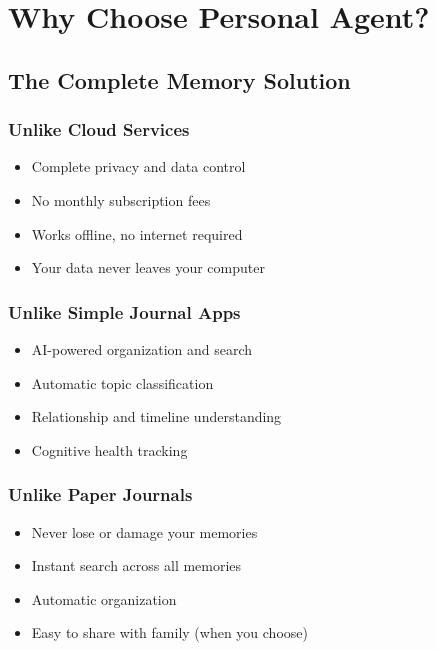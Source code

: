 \documentclass[11pt,letterpaper]{article}
\begin{document}
\section{Why Choose Personal Agent?}

\subsection{The Complete Memory Solution}

\subsubsection{Unlike Cloud Services}
\begin{itemize}[leftmargin=*]
    \item \textcolor{secondarygreen}{\checkmark} Complete privacy and data control
    \item \textcolor{secondarygreen}{\checkmark} No monthly subscription fees
    \item \textcolor{secondarygreen}{\checkmark} Works offline, no internet required
    \item \textcolor{secondarygreen}{\checkmark} Your data never leaves your computer
\end{itemize}

\subsubsection{Unlike Simple Journal Apps}
\begin{itemize}[leftmargin=*]
    \item \textcolor{secondarygreen}{\checkmark} AI-powered organization and search
    \item \textcolor{secondarygreen}{\checkmark} Automatic topic classification
    \item \textcolor{secondarygreen}{\checkmark} Relationship and timeline understanding
    \item \textcolor{secondarygreen}{\checkmark} Cognitive health tracking
\end{itemize}

\subsubsection{Unlike Paper Journals}
\begin{itemize}[leftmargin=*]
    \item \textcolor{secondarygreen}{\checkmark} Never lose or damage your memories
    \item \textcolor{secondarygreen}{\checkmark} Instant search across all memories
    \item \textcolor{secondarygreen}{\checkmark} Automatic organization
    \item \textcolor{secondarygreen}{\checkmark} Easy to share with family (when you choose)
\end{itemize}
\end{document}
